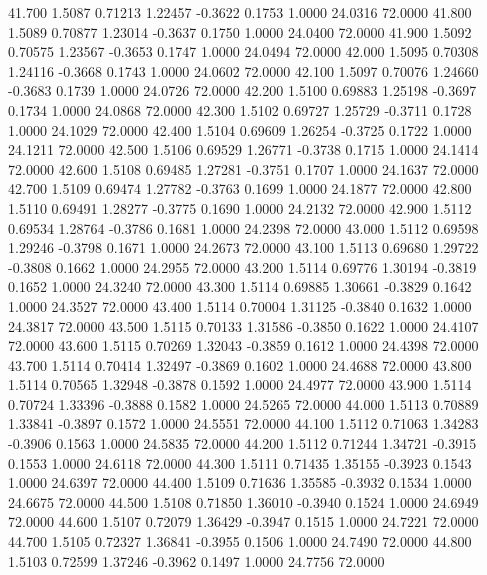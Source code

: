   41.700   1.5087   0.71213   1.22457  -0.3622   0.1753   1.0000  24.0316  72.0000
  41.800   1.5089   0.70877   1.23014  -0.3637   0.1750   1.0000  24.0400  72.0000
  41.900   1.5092   0.70575   1.23567  -0.3653   0.1747   1.0000  24.0494  72.0000
  42.000   1.5095   0.70308   1.24116  -0.3668   0.1743   1.0000  24.0602  72.0000
  42.100   1.5097   0.70076   1.24660  -0.3683   0.1739   1.0000  24.0726  72.0000
  42.200   1.5100   0.69883   1.25198  -0.3697   0.1734   1.0000  24.0868  72.0000
  42.300   1.5102   0.69727   1.25729  -0.3711   0.1728   1.0000  24.1029  72.0000
  42.400   1.5104   0.69609   1.26254  -0.3725   0.1722   1.0000  24.1211  72.0000
  42.500   1.5106   0.69529   1.26771  -0.3738   0.1715   1.0000  24.1414  72.0000
  42.600   1.5108   0.69485   1.27281  -0.3751   0.1707   1.0000  24.1637  72.0000
  42.700   1.5109   0.69474   1.27782  -0.3763   0.1699   1.0000  24.1877  72.0000
  42.800   1.5110   0.69491   1.28277  -0.3775   0.1690   1.0000  24.2132  72.0000
  42.900   1.5112   0.69534   1.28764  -0.3786   0.1681   1.0000  24.2398  72.0000
  43.000   1.5112   0.69598   1.29246  -0.3798   0.1671   1.0000  24.2673  72.0000
  43.100   1.5113   0.69680   1.29722  -0.3808   0.1662   1.0000  24.2955  72.0000
  43.200   1.5114   0.69776   1.30194  -0.3819   0.1652   1.0000  24.3240  72.0000
  43.300   1.5114   0.69885   1.30661  -0.3829   0.1642   1.0000  24.3527  72.0000
  43.400   1.5114   0.70004   1.31125  -0.3840   0.1632   1.0000  24.3817  72.0000
  43.500   1.5115   0.70133   1.31586  -0.3850   0.1622   1.0000  24.4107  72.0000
  43.600   1.5115   0.70269   1.32043  -0.3859   0.1612   1.0000  24.4398  72.0000
  43.700   1.5114   0.70414   1.32497  -0.3869   0.1602   1.0000  24.4688  72.0000
  43.800   1.5114   0.70565   1.32948  -0.3878   0.1592   1.0000  24.4977  72.0000
  43.900   1.5114   0.70724   1.33396  -0.3888   0.1582   1.0000  24.5265  72.0000
  44.000   1.5113   0.70889   1.33841  -0.3897   0.1572   1.0000  24.5551  72.0000
  44.100   1.5112   0.71063   1.34283  -0.3906   0.1563   1.0000  24.5835  72.0000
  44.200   1.5112   0.71244   1.34721  -0.3915   0.1553   1.0000  24.6118  72.0000
  44.300   1.5111   0.71435   1.35155  -0.3923   0.1543   1.0000  24.6397  72.0000
  44.400   1.5109   0.71636   1.35585  -0.3932   0.1534   1.0000  24.6675  72.0000
  44.500   1.5108   0.71850   1.36010  -0.3940   0.1524   1.0000  24.6949  72.0000
  44.600   1.5107   0.72079   1.36429  -0.3947   0.1515   1.0000  24.7221  72.0000
  44.700   1.5105   0.72327   1.36841  -0.3955   0.1506   1.0000  24.7490  72.0000
  44.800   1.5103   0.72599   1.37246  -0.3962   0.1497   1.0000  24.7756  72.0000
